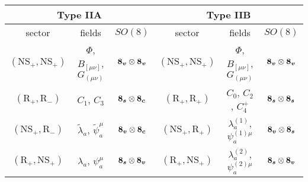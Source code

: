 \begin{tabular}{|ccc|ccc|}
	\hline
	\multicolumn{3}{|c|}{\textbf{Type IIA}}            & \multicolumn{3}{c|}{\textbf{Type IIB}}                                                                                                                                                                                   \\ \hline
	\multicolumn{1}{|c|}{sector}                       & fields                                    & \multicolumn{1}{|c|}{$SO(8)$}         & \multicolumn{1}{c|}{sector}                       & fields                                   & \multicolumn{1}{|c|}{$SO(8)$}         \\ \hline
	\multicolumn{1}{|c|}{$(\text{NS}_+, \text{NS}_+)$} & $\Phi$, $B_{[\mu\nu]}$, $G_{(\mu\nu)}$    & \multicolumn{1}{|c|}{$\boldsymbol{8_v} \otimes \boldsymbol{8_v}$} & \multicolumn{1}{c|}{$(\text{NS}_+, \text{NS}_+)$} & $\Phi$, $B_{[\mu\nu]}$, $G_{(\mu\nu)}$   & \multicolumn{1}{|c|}{$\boldsymbol{8_v} \otimes \boldsymbol{8_v}$} \\ \hline
	\multicolumn{1}{|c|}{$(\text{R}_+, \text{R}_-)$}   & $C_1$, $C_3$                              & \multicolumn{1}{|c|}{$\boldsymbol{8_s}\otimes\boldsymbol{8_c}$}   & \multicolumn{1}{c|}{$(\text{R}_+, \text{R}_+)$}   & $C_0$, $C_2$, $C_4^+$                    & \multicolumn{1}{|c|}{$\boldsymbol{8_s}\otimes\boldsymbol{8_s}$}   \\ \hline
	\multicolumn{1}{|c|}{$(\text{NS}_+,\text{R}_-)$}   & $\tilde{\lambda}_a$, $\tilde{\psi}^\mu_a$ & \multicolumn{1}{|c|}{$\boldsymbol{8_v}\otimes\boldsymbol{8_c}$}   & \multicolumn{1}{c|}{$(\text{NS}_+,\text{R}_+)$}   & ${\lambda}^{(1)}_a$, ${\psi}^{(1)\mu}_a$ & \multicolumn{1}{|c|}{$\boldsymbol{8_v}\otimes\boldsymbol{8_s}$}   \\ \hline


	\multicolumn{1}{|c|}{$(\text{R}_+, \text{NS}_+)$}  & ${\lambda}_a$, ${\psi}^\mu_a$             & \multicolumn{1}{|c|}{$\boldsymbol{8_s}\otimes\boldsymbol{8_v}$}   & \multicolumn{1}{c|}{$(\text{R}_+, \text{NS}_+)$}  & ${\lambda}^{(2)}_a$, ${\psi}^{(2)\mu}_a$ & \multicolumn{1}{|c|}{$\boldsymbol{8_s}\otimes\boldsymbol{8_v}$}   \\ \hline
\end{tabular}